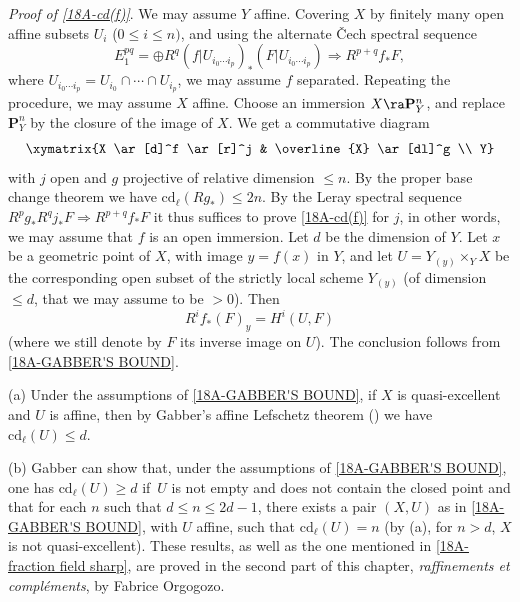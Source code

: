 \documentclass[10pt]{../fichiers-configuration-latex/smfart}
\begin{document}
\textit{Proof of \ref{18A-cd(f)}}. We may assume $Y$ affine. Covering $X$ by finitely many open
affine subsets $U_i$ ($0 \le i \le  n)$, and using the alternate \v Cech spectral sequence $$
E^{pq}_1 = \oplus R^q(f|U_{i_0 \cdots i_p})_*(F|U_{i_0 \cdots i_p}) \Rightarrow R^{p+q}f_*F, $$
where $U_{i_0 \cdots i_p} = U_{i_0} \cap \cdots \cap U_{i_p}$, we may assume $f$ separated.
Repeating the procedure, we may assume $X$ affine. Choose an immersion $X \ra \mathbf{P}^n_Y$, and
replace $\mathbf{P}^n_Y$ by the closure of the image of $X$. We get a commutative diagram $$
\xymatrix{X \ar[d]^f \ar[r]^j & \overline{X} \ar[dl]^g \\ Y} $$ with $j$ open and $g$ projective of
relative dimension $\le n$. By the proper base change theorem we have $\mathrm{cd}_{\ell}(Rg_*) \le
2n$. By the Leray spectral sequence $R^pg_*R^qj_*F \Rightarrow R^{p+q}f_*F$ it thus suffices to
prove \ref{18A-cd(f)} for $j$, in other words, we may assume that $f$ is an open immersion. Let $d$
be the dimension of $Y$. Let $x$ be a geometric point of $X$, with image $y = f(x)$ in $Y$, and let
$U = Y_{(y)} \times_Y X$ be the corresponding open subset of the strictly local scheme $Y_{(y)}$ (of
dimension $\le d$, that we may assume to be $>0$). Then $$ R^if_*(F)_y = H^i(U,F) $$ (where we still
denote by $F$ its inverse image on $U$). The conclusion follows from \ref{18A-GABBER'S BOUND}.
\begin{remark} \label{18A-remark-d-2d-1} (a) Under the assumptions of \ref{18A-GABBER'S BOUND}, if
$X$ is quasi-excellent and $U$ is affine, then by Gabber's affine Lefschetz theorem
() we have $\mathrm{cd}_{\ell}(U) \le d$. 

(b) Gabber can show that, under the assumptions of \ref{18A-GABBER'S BOUND}, one has
$\mathrm{cd}_{\ell}(U) \ge d$ if $U$ is not empty and does not contain the closed point and that for
each $n$ such that $d \le n \le 2d-1$, there exists a pair $(X,U)$ as in \ref{18A-GABBER'S BOUND},
with $U$ affine, such that $\mathrm{cd}_{\ell}(U) = n$ (by (a), for $n > d$, $X$ is not
quasi-excellent). These results, as well as the one mentioned in \ref{18A-fraction field sharp}, are
proved in the second part of this chapter, \emph{raffinements et compléments}, by Fabrice Orgogozo.
\end{remark}
\end{document}
